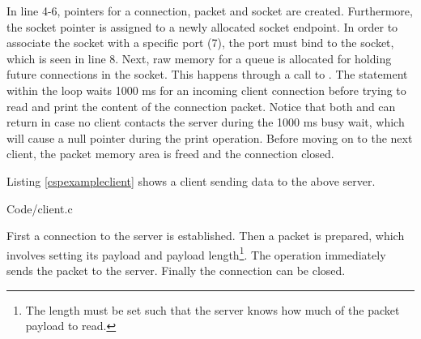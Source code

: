 In line 4-6, pointers for a connection, packet and socket are created. Furthermore, the socket pointer is assigned to a newly allocated socket endpoint. In order to associate the socket with a specific port (7), the port must bind to the socket, which is seen in line 8. Next, raw memory for a queue is allocated for holding future connections in the socket. This happens through a call to . The  statement within the loop waits 1000 ms for an incoming client connection before trying to read and print the content of the connection packet. Notice that both  and  can return  in case no client contacts the server during the 1000 ms busy wait, which will cause a null pointer during the print operation. Before moving on to the next client, the packet memory area is freed and the connection closed. 

Listing \ref{cspexampleclient} shows a client sending data to the above server.


{Code/client.c}

First a connection to the server is established. Then a packet is prepared, which involves setting its payload and payload length\footnote{The length must be set such that the server knows how much of the packet payload to read.}. The  operation immediately sends the packet to the server. Finally the connection can be closed.